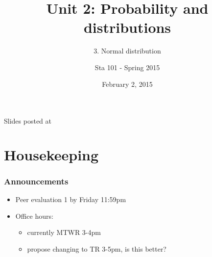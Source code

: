 \documentclass[slidestop,compress,mathserif,12pt,t,professionalfonts,xcolor=table]{beamer}
\title{Unit 2: Probability and distributions}
\subtitle{3. Normal distribution}
\author{Sta 101 - Spring 2015}
\date{February 2, 2015}
\institute{Duke University, Department of Statistical Science}
\begin{document}



\begin{frame}[plain]

\titlepage
\vfill
{\scriptsize {} \hfill Slides posted at  \webLink{\CourseSite}{\CourseSite}}
\addtocounter{framenumber}{-1} 

\end{frame}


\section{Housekeeping}


\begin{frame}
\frametitle{Announcements}

\begin{itemize}

\item Peer evaluation 1 by Friday 11:59pm




\item Office hours: 
\begin{itemize}
\item currently MTWR 3-4pm
\item propose changing to TR 3-5pm, is this better? \\
\end{itemize}




\end{itemize}


\end{frame}
\end{document}
